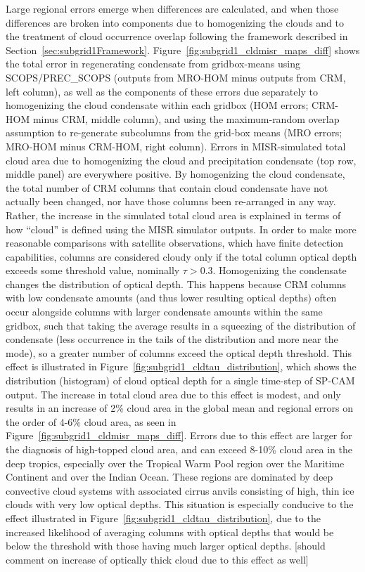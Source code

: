 Large regional errors emerge when differences are calculated, and when
those differences are broken into components due to homogenizing the
clouds and to the treatment of cloud occurrence overlap following the
framework described in Section~\ref{sec:subgrid1Framework}.
Figure~\ref{fig:subgrid1_cldmisr_maps_diff} shows the total error in
regenerating condensate from gridbox-means using SCOPS/PREC\_SCOPS
(outputs from MRO-HOM minus outputs from CRM, left column), as well as
the components of these errors due separately to homogenizing the cloud
condensate within each gridbox (HOM errors; CRM-HOM minus CRM, middle
column), and using the maximum-random overlap assumption to re-generate
subcolumns from the grid-box means (MRO errors; MRO-HOM minus CRM-HOM,
right column). Errors in MISR-simulated total cloud area due to
homogenizing the cloud and precipitation condensate (top row, middle
panel) are everywhere positive. By homogenizing the cloud condensate,
the total number of CRM columns that contain cloud condensate have not
actually been changed, nor have those columns been re-arranged in any
way. Rather, the increase in the simulated total cloud area is explained
in terms of how ``cloud'' is defined using the MISR simulator outputs.
In order to make more reasonable comparisons with satellite
observations, which have finite detection capabilities, columns are
considered cloudy only if the total column optical depth exceeds some
threshold value, nominally \(\tau > 0.3\). Homogenizing the condensate
changes the distribution of optical depth. This happens because CRM
columns with low condensate amounts (and thus lower resulting optical
depths) often occur alongside columns with larger condensate amounts
within the same gridbox, such that taking the average results in a
squeezing of the distribution of condensate (less occurrence in the
tails of the distribution and more near the mode), so a greater number
of columns exceed the optical depth threshold. This effect is
illustrated in Figure~\ref{fig:subgrid1_cldtau_distribution}, which
shows the distribution (histogram) of cloud optical depth for a single
time-step of SP-CAM output. The increase in total cloud area due to this
effect is modest, and only results in an increase of 2\% cloud area in
the global mean and regional errors on the order of 4-6\% cloud area, as
seen in Figure~\ref{fig:subgrid1_cldmisr_maps_diff}. Errors due to this
effect are larger for the diagnosis of high-topped cloud area, and can
exceed 8-10\% cloud area in the deep tropics, especially over the
Tropical Warm Pool region over the Maritime Continent and over the
Indian Ocean. These regions are dominated by deep convective cloud
systems with associated cirrus anvils consisting of high, thin ice
clouds with very low optical depths. This situation is especially
conducive to the effect illustrated in
Figure~\ref{fig:subgrid1_cldtau_distribution}, due to the increased
likelihood of averaging columns with optical depths that would be below
the threshold with those having much larger optical depths. {[}should
comment on increase of optically thick cloud due to this effect as
well{]}

